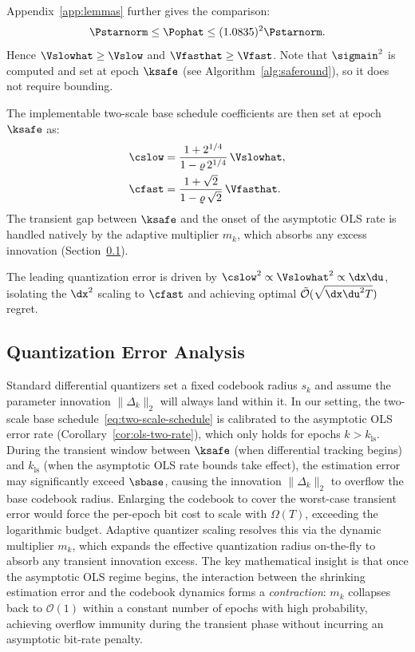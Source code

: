 \documentclass[11pt,journal,onecolumn]{IEEEtran}
\begin{document}
\noindent Appendix~\ref{app:lemmas} further gives the comparison:
\begin{equation}
    \label{eq:Pophat-ratio-main}
    \Pstarnorm \le \Pophat \le (1.0835)^2 \Pstarnorm.
\end{equation}
Hence $\Vslowhat \ge \Vslow$ and $\Vfasthat \ge \Vfast$. Note that $\sigmain^2$ is computed and set at epoch $\ksafe$ (see Algorithm~\ref{alg:saferound}), so it does not require bounding.

The implementable two-scale base schedule coefficients are then set at epoch $\ksafe$ as:
\begin{align}
    \cslow &= \frac{1 + 2^{1/4}}{1 - \varrho\,2^{1/4}}\,\Vslowhat, \label{eq:cslow-impl} \\
    \cfast &= \frac{1+\sqrt{2}}{1 - \varrho\,\sqrt{2}}\,\Vfasthat. \label{eq:cfast-impl}
\end{align}
The transient gap between $\ksafe$ and the onset of the asymptotic OLS rate is handled natively by the adaptive multiplier $m_k$, which absorbs any excess innovation (Section~\ref{sec:contraction}).

The leading quantization error is driven by $\cslow^2 \propto \Vslowhat^2 \propto \dx\du$, isolating the $\dx^2$ scaling to $\cfast$ and achieving optimal $\tilde{\mathcal{O}}(\sqrt{\dx\du^2 T})$ regret.


\subsection{Quantization Error Analysis}
\label{sec:contraction}

Standard differential quantizers set a fixed codebook radius $s_k$ and assume the parameter innovation $\|\Delta_k\|_2$ will always land within it. In our setting, the two-scale base schedule~\eqref{eq:two-scale-schedule} is calibrated to the asymptotic OLS error rate (Corollary~\ref{cor:ols-two-rate}), which only holds for epochs $k > k_{\mathrm{ls}}$. During the transient window between $\ksafe$ (when differential tracking begins) and $k_{\mathrm{ls}}$ (when the asymptotic OLS rate bounds take effect), the estimation error may significantly exceed $\sbase$, causing the innovation $\|\Delta_k\|_2$ to overflow the base codebook radius. Enlarging the codebook to cover the worst-case transient error would force the per-epoch bit cost to scale with $\Omega(T)$, exceeding the logarithmic budget. Adaptive quantizer scaling resolves this via the dynamic multiplier $m_k$, which expands the effective quantization radius on-the-fly to absorb any transient innovation excess. The key mathematical insight is that once the asymptotic OLS regime begins, the interaction between the shrinking estimation error and the codebook dynamics forms a \emph{contraction}: $m_k$ collapses back to $\mathcal{O}(1)$ within a constant number of epochs with high probability, achieving overflow immunity during the transient phase without incurring an asymptotic bit-rate penalty.
\end{document}
